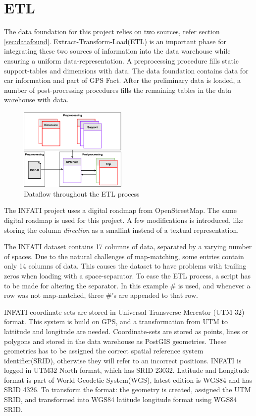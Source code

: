 \section{ETL}\label{sec:ETL}
The data foundation for this project relies on two sources, refer section \ref{sec:datafound}. Extract-Transform-Load(ETL) is an important phase for integrating these two sources of information into the data warehouse while ensuring a uniform data-representation. A preprocessing procedure fills static support-tables and dimensions with data. The data foundation contains data for car information and part of GPS Fact. After the preliminary data is loaded, a number of post-processing procedures fills the remaining tables in the data warehouse with data.

\begin{figure}[tb]
\centering
\includegraphics[width=0.465\textwidth]{Pictures/ETL}
\caption{Dataflow throughout the ETL process}
\label{fig:etl}
\end{figure}

The INFATI project\cite{art:INFATI} uses a digital roadmap from OpenStreetMap\cite{osm}. The same digital roadmap is used for this project. A few modifications is introduced, like storing the column \textit{direction} as a smallint instead of a textual representation. 

The INFATI dataset\cite{art:INFATI} contains 17 columns of data, separated by a varying number of spaces. Due to the natural challenges of map-matching, some entries contain only 14 columns of data. This causes the dataset to have problems with trailing zeros when loading with a space-separator. To ease the ETL process, a script has to be made for altering the separator. In this example \# is used, and whenever a row was not map-matched, three \#'s are appended to that row.

INFATI coordinate-sets are stored in Universal Transverse Mercator (UTM 32) format. This system is build on GPS, and a transformation from UTM to lattitude and longitude are needed. Coordinate-sets are stored as points, lines or polygons and stored in the data warehouse as PostGIS\cite{postgis} geometries. These geometries has to be assigned the correct spatial reference system identifier(SRID), otherwise they will refer to an incorrect positions. INFATI is logged in UTM32 North format, which has SRID 23032\cite{UTM32N}. Latitude and Longitude format is part of World Geodetic System(WGS), latest edition is WGS84 and has SRID 4326\cite{WGS84}. To transform the format: the geometry is created, assigned the UTM SRID, and transformed into WGS84 latitude longitude format using WGS84 SRID. 

